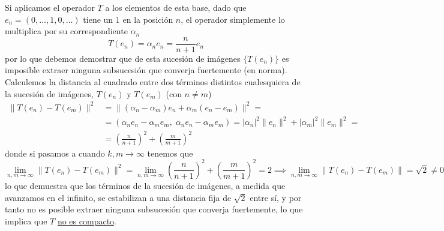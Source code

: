 \begin{ejercicio}
    \noindent
    Si aplicamos el operador $T$ a los elementos de esta base, dado que $e_n = (0, \dots, 1, 0, \dots)$ tiene un $1$ en la posición $n$, el operador simplemente lo multiplica por su correspondiente $\alpha_n$
    $$T(e_n) = \alpha_n e_n = \frac{n}{n+1} e_n$$
    por lo que debemos demostrar que de esta sucesión de imágenes $\{T(e_n)\}$ es imposible extraer ninguna subsucesión que converja fuertemente (en norma). Calculemos la distancia al cuadrado entre dos términos distintos cualesquiera de la sucesión de imágenes, $T(e_n)$ y $T(e_m)$ (con $n \neq m$)
    \begin{align*}
        \|T(e_n) - T(e_m)\|^2 &= \|(\alpha_n - \alpha_m) e_n + \alpha_m (e_n - e_m)\|^2= \\
        &=(\alpha_n e_n - \alpha_m e_m, \; \alpha_n e_n - \alpha_m e_m )=|\alpha_n|^2\|e_n\|^2 + |\alpha_m|^2 \|e_m\|^2=\\
        &= \left(\frac{n}{n+1}\right)^2 + \left(\frac{m}{m+1}\right)^2 
    \end{align*}
    donde si pasamos a cuando $k,m\to \infty$ tenemos que
    \begin{equation*}
        \lim_{n,m \to \infty} \|T(e_n) - T(e_m)\|^2 = \lim_{n,m \to \infty} \left(\frac{n}{n+1}\right)^2 + \left(\frac{m}{m+1}\right)^2 = 2\implies \lim_{n,m \to \infty} \|T(e_n) - T(e_m)\| = \sqrt{2} \neq 0
    \end{equation*}
    lo que demuestra que los términos de la sucesión de imágenes, a medida que avanzamos en el infinito, se estabilizan a una distancia fija de $\sqrt{2}$ entre sí, y por tanto no es posible extraer ninguna subsucesión que converja fuertemente, lo que implica que $T$ \underline{no es compacto}.
\end{ejercicio}


